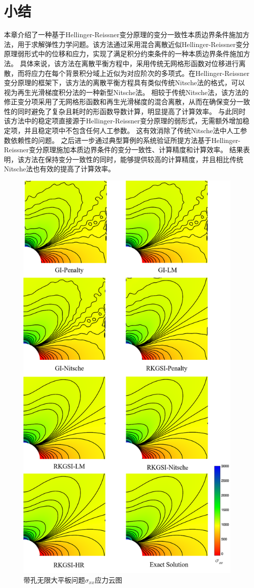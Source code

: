 \section{小结}
本章介绍了一种基于Hellinger-Reissner变分原理的变分一致性本质边界条件施加方法，用于求解弹性力学问题。该方法通过采用混合离散近似Hellinger-Reissner变分原理弱形式中的位移和应力，实现了满足积分约束条件的一种本质边界条件施加方法。
具体来说，该方法在离散平衡方程中，采用传统无网格形函数对位移进行离散，而将应力在每个背景积分域上近似为对应阶次的多项式。在Hellinger-Reissner变分原理的框架下，该方法的离散平衡方程具有类似传统Nitsche法的格式，可以视为再生光滑梯度积分法的一种新型Nitsche法。
相较于传统Nitsche法，该方法的修正变分项采用了无网格形函数和再生光滑梯度的混合离散，从而在确保变分一致性的同时避免了复杂且耗时的形函数导数计算，明显提高了计算效率。
与此同时该方法中的稳定项直接源于Hellinger-Reissner变分原理的弱形式，无需额外增加稳定项，并且稳定项中不包含任何人工参数。
这有效消除了传统Nitsche法中人工参数依赖性的问题。
之后进一步通过典型算例的系统验证所提方法基于Hellinger-Reissner变分原理施加本质边界条件的变分一致性、计算精度和计算效率。
结果表明，该方法在保持变分一致性的同时，能够提供较高的计算精度，并且相比传统Nitsche法也有效的提高了计算效率。
\begin{figure}[H]
    \centering
    \includegraphics[scale=0.5]{figure/EHR/hole/sigmaxx.png}
\caption{带孔无限大平板问题$\sigma_{xx}$应力云图}\label{sigmaxx}
\end{figure}
